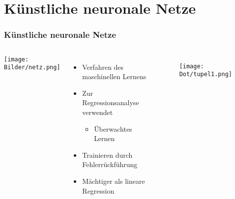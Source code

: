 \documentclass{beamer}
\begin{document}
\section{Künstliche neuronale Netze}
\begin{frame}
\frametitle{Künstliche neuronale Netze}
\begin{columns}
\begin{center}
	\texttt{[image: Bilder/netz.png]}
\end{center}
\begin{itemize}
	\item Verfahren des maschinellen Lernens
	\item Zur Regressionsanalyse verwendet
		\begin{itemize}
			\item Überwachtes Lernen
		\end{itemize}
	\item Trainieren durch Fehlerrückführung
	\item Mächtiger als lineare Regression
\end{itemize}

\begin{figure}
	\hspace*{-0.5cm}
	\texttt{[image: Dot/tupel1.png]}
\end{figure}
\end{columns}
\end{frame}
\end{document}
